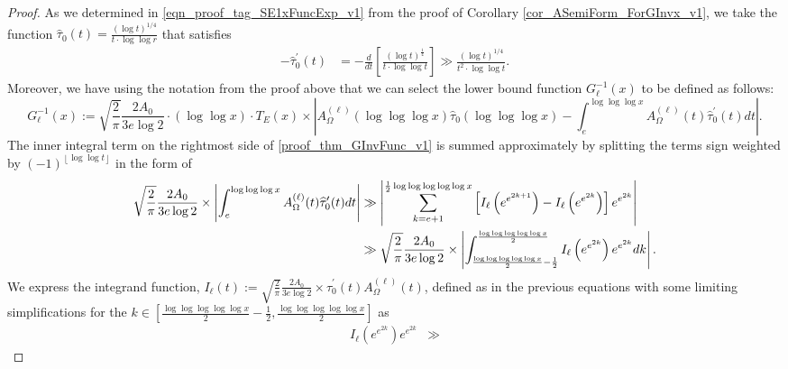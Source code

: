 \documentclass[11pt,reqno,a4letter]{article}
\numberwithin{figure}{section}
\numberwithin{table}{section}
\newcommand{\floor}[1]{\left\lfloor #1 \right\rfloor}
\theoremstyle{plain}
\numberwithin{theorem}{section}
\theoremstyle{definition}
\newcommand{\SuccSim}[0]{\overset{_{\scriptsize{\blacktriangle}}}{\succsim}}
\renewcommand{\SuccSim}[0]{\ensuremath{\gg}}
\begin{document}
\begin{proof}
As we determined in \eqref{eqn_proof_tag_SE1xFuncExp_v1} from the proof of 
Corollary \ref{cor_ASemiForm_ForGInvx_v1}, we take the function 
$\widehat{\tau}_0(t) = \frac{(\log t)^{1/4}}{t \cdot \log\log r}$ that satisfies 
\begin{align*} 
-\widehat{\tau}_0^{\prime}(t) & = -\frac{d}{dt}\left[ 
     \frac{(\log t)^{\frac{1}{4}}}{t \cdot \log\log t} 
     \right] \SuccSim \frac{(\log t)^{1/4}}{t^2 \cdot \log\log t}. 
\end{align*} 
Moreover, we have using the notation from the proof above that we can select 
the lower bound function $G_{\ell}^{-1}(x)$ to be defined as follows: 
\begin{equation} 
\label{proof_thm_GInvFunc_v1} 
G_{\ell}^{-1}(x) := \sqrt{\frac{2}{\pi}} \frac{2 A_0}{3e \log 2} \cdot (\log\log x) \cdot 
     T_E(x) \times 
     \left\lvert A_{\Omega}^{(\ell)}(\log\log\log x) \widehat{\tau}_0(\log\log\log x) - 
     \int_e^{\log\log\log x} A_{\Omega}^{(\ell)}(t) \widehat{\tau}_0^{\prime}(t) dt 
     \right\rvert. 
\end{equation} 
The inner integral term on the rightmost side of \eqref{proof_thm_GInvFunc_v1} 
is summed approximately by splitting the terms sign weighted by 
$(-1)^{\floor{\log\log t}}$ in the form of 
\begin{align} 
\label{eqn_proof_thm_GInvFunc_v3_approx} 
\sqrt{\frac{2}{\pi}} \frac{2 A_0}{3e \log 2} \times 
     \left\lvert \int_{e}^{\log\log\log x} A_{\Omega}^{(\ell)}(t)\widehat{\tau}_0^{\prime}(t) dt 
     \right\rvert & \gg 
     \left\lvert \sum_{k=e+1}^{\frac{1}{2}\log\log\log\log\log x} \left[ 
     I_{\ell}\left(e^{e^{2k+1}}\right) - 
     I_{\ell}\left(e^{e^{2k}}\right) 
     \right] e^{e^{2k}} \right\rvert \\ 
\notag 
     & \gg 
     \sqrt{\frac{2}{\pi}} \frac{2 A_0}{3e \log 2} \times 
     \left\lvert 
     \int_{\frac{\log\log\log\log\log x}{2}-\frac{1}{2}}^{\frac{\log\log\log\log\log x}{2}} 
     I_{\ell}\left(e^{e^{2k}}\right) 
     e^{e^{2k}} dk \right\rvert. 
\end{align} 
We express the integrand function, 
$I_{\ell}(t) := \sqrt{\frac{2}{\pi}} \frac{2 A_0}{3e \log 2} \times 
 \widehat{\tau}_0^{\prime}(t) A_{\Omega}^{(\ell)}(t)$, 
defined as in the previous equations with some limiting simplifications for the 
$k \in \left[\frac{\log\log\log\log\log x}{2}-\frac{1}{2}, \frac{\log\log\log\log\log x}{2}\right]$ as 
\begin{align} 
\label{eqn_proof_thm_GInvFunc_v3_approx} 
I_{\ell}\left(e^{e^{2k}}\right) e^{e^{2k}}& \SuccSim 

\end{align}
\end{proof}
\end{document}
